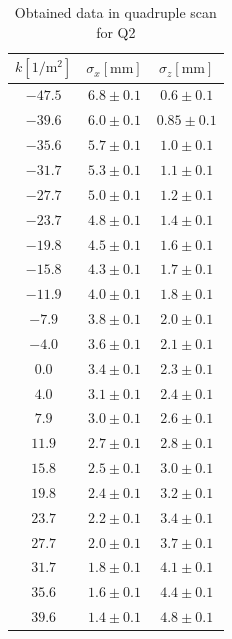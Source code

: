 \documentclass[12pt]{article}
\begin{document}
\begin{table}[H]
    \centering
    \begin{tabular}{c|c|c}
    \hline
    \hline
        $k \mathrm{[1/m^2]}$& $\sigma_x \mathrm{[mm]}$ & $\sigma_z \mathrm{[mm]}$ \\
    \hline
        $ -47.5 $ & $ 6.8 \pm 0.1 $ & $ 0.6 \pm 0.1 $ \\ 
        $ -39.6 $ & $ 6.0 \pm 0.1 $ & $ 0.85 \pm 0.1 $ \\ 
        $ -35.6 $ & $ 5.7 \pm 0.1 $ & $ 1.0 \pm 0.1 $ \\ 
        $ -31.7 $ & $ 5.3 \pm 0.1 $ & $ 1.1 \pm 0.1 $ \\ 
        $ -27.7 $ & $ 5.0 \pm 0.1 $ & $ 1.2 \pm 0.1 $ \\ 
        $ -23.7 $ & $ 4.8 \pm 0.1 $ & $ 1.4 \pm 0.1 $ \\ 
        $ -19.8 $ & $ 4.5 \pm 0.1 $ & $ 1.6 \pm 0.1 $ \\ 
        $ -15.8 $ & $ 4.3 \pm 0.1 $ & $ 1.7 \pm 0.1 $ \\ 
        $ -11.9 $ & $ 4.0 \pm 0.1 $ & $ 1.8 \pm 0.1 $ \\ 
        $ -7.9 $ & $ 3.8 \pm 0.1 $ & $ 2.0 \pm 0.1 $ \\ 
        $ -4.0 $ & $ 3.6 \pm 0.1 $ & $ 2.1 \pm 0.1 $ \\ 
        $ 0.0 $ & $ 3.4 \pm 0.1 $ & $ 2.3 \pm 0.1 $ \\ 
        $ 4.0 $ & $ 3.1 \pm 0.1 $ & $ 2.4 \pm 0.1 $ \\ 
        $ 7.9 $ & $ 3.0 \pm 0.1 $ & $ 2.6 \pm 0.1 $ \\ 
        $ 11.9 $ & $ 2.7 \pm 0.1 $ & $ 2.8 \pm 0.1 $ \\ 
        $ 15.8 $ & $ 2.5 \pm 0.1 $ & $ 3.0 \pm 0.1 $ \\ 
        $ 19.8 $ & $ 2.4 \pm 0.1 $ & $ 3.2 \pm 0.1 $ \\ 
        $ 23.7 $ & $ 2.2 \pm 0.1 $ & $ 3.4 \pm 0.1 $ \\ 
        $ 27.7 $ & $ 2.0 \pm 0.1 $ & $ 3.7 \pm 0.1 $ \\ 
        $ 31.7 $ & $ 1.8 \pm 0.1 $ & $ 4.1 \pm 0.1 $ \\ 
        $ 35.6 $ & $ 1.6 \pm 0.1 $ & $ 4.4 \pm 0.1 $ \\ 
        $ 39.6 $ & $ 1.4 \pm 0.1 $ & $ 4.8 \pm 0.1 $ \\  
        \hline
    \end{tabular}
    \caption{Obtained data in quadruple scan for Q2}
    \label{Q2row}
\end{table}
\end{document}
